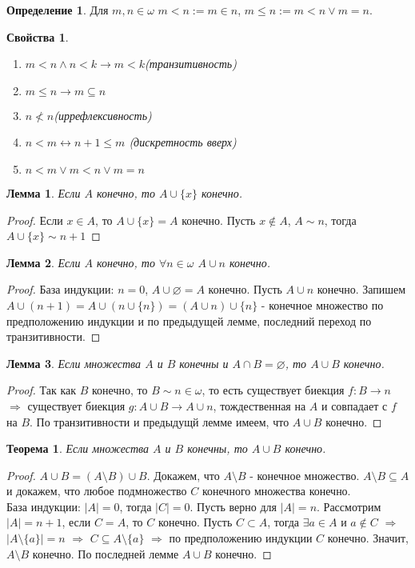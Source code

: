 \documentclass[a4paper, 12pt]{article}
\theoremstyle{definition}
\newtheorem*{definition}{Определение}
\theoremstyle{plain}
\newtheorem*{theorem}{Теорема}
\newtheorem*{lemma}{Лемма}
\newtheorem*{properties}{Свойства}
\theoremstyle{remark}
\begin{document}
  \begin{definition}
    Для $m, n\in\omega$ $m<n:=m\in n$, $m\leqslant n:=m<n\vee m=n$.
  \end{definition}
  \begin{properties}
    \begin{enumerate}
      \item $m<n\wedge n<k\to m<k$(транзитивность)
      \item $m\leqslant n\to m\subseteq n$
      \item $n\not< n$(иррефлексивность)
      \item $n<m\leftrightarrow n+1\leqslant m$ (дискретность вверх)
      \item $n<m\vee m<n\vee m=n$
    \end{enumerate}
  \end{properties}
  \begin{lemma}
    Если $A$ конечно, то $A\cup\{x\}$ конечно. 
  \end{lemma}
  \begin{proof}
    Если $x\in A$, то $A\cup\{x\}=A$ конечно.
    Пусть $x\notin A$, $A\sim n$, тогда $A\cup\{x\}\sim n+1$ 
  \end{proof}
  \begin{lemma}
    Если $A$ конечно, то $\forall n\in\omega$ $A\cup n$ конечно.
  \end{lemma}
  \begin{proof}
    База индукции: $n=0$, $A\cup\varnothing=A$ конечно.
    Пусть $A\cup n$ конечно. Запишем $A\cup(n+1)=A\cup(n\cup\{n\})=(A\cup n)\cup\{n\}$ - конечное множество по предположению индукции и по предыдущей лемме, последний переход по транзитивности.
  \end{proof}
  \begin{lemma}
    Если множества $A$ и $B$ конечны и $A\cap B=\varnothing$, то $A\cup B$ конечно.
  \end{lemma}
  \begin{proof}
    Так как $B$ конечно, то $B\sim n\in\omega$, то есть существует биекция $f:B\to n$ $\Longrightarrow$ существует биекция $g: A\cup B\to A\cup n$, тождественная на $A$ и совпадает с $f$ на $B$. По транзитивности и предыдущй лемме имеем, что $A\cup B$ конечно.
  \end{proof}
  \begin{theorem}
    Если множества $A$ и $B$ конечны, то $A\cup B$ конечно.
  \end{theorem}
  \begin{proof}
    $A\cup B=(A\setminus B)\cup B$. Докажем, что $A\setminus B$ - конечное множество. $A\setminus B\subseteq A$ и докажем, что любое подмножество $C$ конечного множества конечно.\\
    База индукции: $|A|=0$, тогда $|C|=0$. Пусть верно для $|A|=n$. Рассмотрим $|A|=n+1$, если $C=A$, то $C$ конечно. Пусть $C\subset A$, тогда $\exists a\in A$ и $a\notin C$ $\Longrightarrow$ $|A\setminus\{a\}|=n$ $\Longrightarrow$ $C\subseteq A\setminus\{a\}$ $\Longrightarrow$ по предположению индукции $C$ конечно. Значит, $A\setminus B$ конечно. По последней лемме $A\cup B$ конечно.
  \end{proof}
\end{document}
